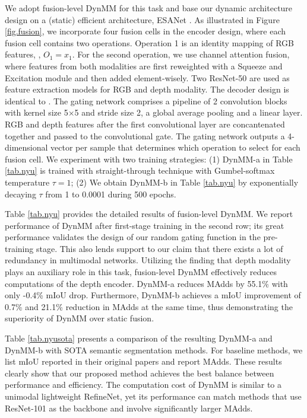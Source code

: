 We adopt fusion-level DynMM for this task and base our dynamic architecture design on a (static) efficient architecture, ESANet \cite{esanet}. As illustrated in Figure \ref{fig.fusion}, we incorporate four fusion cells in the encoder design, where each fusion cell contains two operations. Operation 1 is an identity mapping of RGB features, \ie, $O_1 = x_1$. For the second operation, we use channel attention fusion, where features from both modalities are first reweighted with a Squeeze and Excitation module \cite{hu2018squeeze} and then added element-wisely. Two ResNet-50 \cite{resnet} are used as feature extraction models for RGB and depth modality. The decoder design is identical to \cite{esanet}. The gating network comprises a pipeline of 2 convolution blocks with kernel size 5$\times$5 and stride size 2, a global average pooling and a linear layer. RGB and depth features after the first convolutional layer are concantenated together and passed to the convolutional gate. The gating network outputs a 4-dimensional vector per sample that determines which operation to select for each fusion cell. We experiment with two training strategies: (1) DynMM-a in Table \ref{tab.nyu} is trained with straight-through technique with Gumbel-softmax temperature $\tau=1$; (2) We obtain DynMM-b in Table \ref{tab.nyu} by exponentially decaying $\tau$ from 1 to 0.0001 during 500 epochs.

Table \ref{tab.nyu} provides the detailed results of fusion-level DynMM. We report performance of DynMM after first-stage training in the second row; its great performance validates the design of our random gating function in the pre-training stage. This also lends support to our claim that there exists a lot of redundancy in multimodal networks. Utilizing the finding that depth modality plays an auxiliary role in this task, fusion-level DynMM effectively reduces computations of the depth encoder. DynMM-a reduces MAdds by 55.1\% with only -0.4\% mIoU drop. Furthermore, DynMM-b achieves a mIoU improvement of 0.7\% and 21.1\% reduction in MAdds at the same time, thus demonstrating the superiority of DynMM over static fusion. 


Table \ref{tab.nyusota} presents a comparison of the resulting DynMM-a and DynMM-b with SOTA semantic segmentation methods. For baseline methods, we list mIoU reported in their original papers and report MAdds. These results clearly show that our proposed method achieves the best balance between performance and efficiency. The computation cost of DynMM is similar to a unimodal lightweight RefineNet, yet its performance can match methods that use ResNet-101 as the backbone and involve significantly larger MAdds. 



